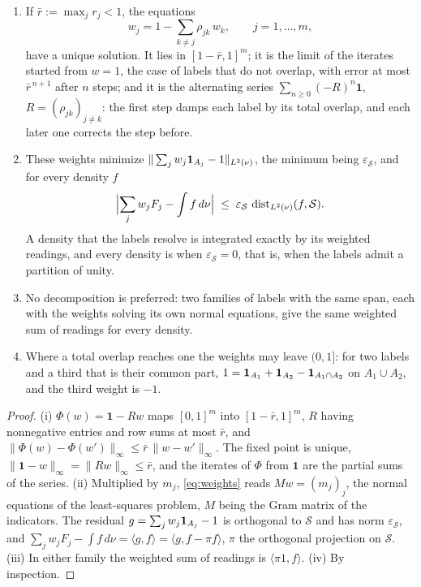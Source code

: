 \begin{proposition}\label{prop:weights}
\leavevmode
\begin{enumerate}[label=\emph{(\roman*)},itemsep=1pt]
\item If $\bar r:=\max_jr_j<1$, the equations
\begin{equation}\label{eq:weights}
w_j=1-\sum_{k\neq j}\rho_{jk}\,w_k,\qquad j=1,\dots,m,
\end{equation}
have a unique solution. It lies in $[1-\bar r,1]^m$; it is the limit of
the iterates started from $w=1$, the case of labels that do not overlap,
with error at most $\bar r^{\,n+1}$ after $n$ steps; and it is the
alternating series $\sum_{n\ge0}(-R)^n\mathbf 1$, $R=(\rho_{jk})_{j\neq k}$:
the first step damps each label by its total overlap, and each later one
corrects the step before.
\item These weights minimize $\|\sum_jw_j\mathbf{1}_{A_j}-1\|_{L^2(\nu)}$, the
minimum being $\varepsilon_{\mathcal S}$, and for every density $f$
\[
\Bigl|\sum_jw_jF_j-\int f\,d\nu\Bigr|\;\le\;
\varepsilon_{\mathcal S}\,\operatorname{dist}_{L^2(\nu)}(f,\mathcal S).
\]
A density that the labels resolve is integrated exactly by its weighted
readings, and every density is when $\varepsilon_{\mathcal S}=0$, that is,
when the labels admit a partition of unity.
\item No decomposition is preferred: two families of labels with the same
span, each with the weights solving its own normal equations, give the
same weighted sum of readings for every density.
\item Where a total overlap reaches one the weights may leave $(0,1]$:
for two labels and a third that is their common part,
$1=\mathbf{1}_{A_1}+\mathbf{1}_{A_2}-\mathbf{1}_{A_1\cap A_2}$ on $A_1\cup A_2$, and the
third weight is $-1$.
\end{enumerate}
\end{proposition}

\begin{proof}
(i) $\Phi(w)=\mathbf 1-Rw$ maps $[0,1]^m$ into $[1-\bar r,1]^m$, $R$ having
nonnegative entries and row sums at most $\bar r$, and
$\|\Phi(w)-\Phi(w')\|_\infty\le\bar r\,\|w-w'\|_\infty$. The fixed point is
unique, $\|\mathbf 1-w\|_\infty=\|Rw\|_\infty\le\bar r$, and the iterates
of $\Phi$ from $\mathbf 1$ are the partial sums of the series. (ii)
Multiplied by $m_j$, \eqref{eq:weights} reads $Mw=(m_j)_j$, the normal
equations of the least-squares problem, $M$ being the Gram matrix of the
indicators. The residual $g=\sum_jw_j\mathbf{1}_{A_j}-1$ is orthogonal to
$\mathcal S$ and has norm $\varepsilon_{\mathcal S}$, and
$\sum_jw_jF_j-\int f\,d\nu=\langle g,f\rangle=\langle g,f-\pi f\rangle$,
$\pi$ the orthogonal projection on $\mathcal S$. (iii) In either family
the weighted sum of readings is $\langle\pi1,f\rangle$. (iv) By
inspection.
\end{proof}

